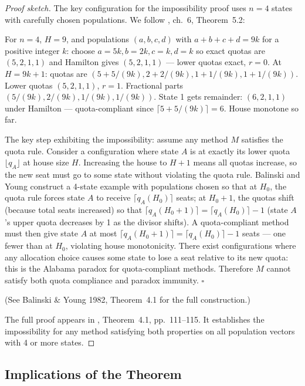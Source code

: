 \begin{proof}[Proof sketch]
  The key configuration for the impossibility proof uses $n = 4$ states
  with carefully chosen populations.
  We follow \citet{balinski1982fair}, ch.~6, Theorem~5.2:

  For $n = 4$, $H = 9$, and populations $(a, b, c, d)$ with
  $a + b + c + d = 9k$ for a positive integer $k$:
  choose $a = 5k, b = 2k, c = k, d = k$ so exact quotas are $(5, 2, 1, 1)$
  and Hamilton gives $(5,2,1,1)$ --- lower quotas exact, $r=0$.
  At $H = 9k+1$: quotas are $(5+5/(9k), 2+2/(9k), 1+1/(9k), 1+1/(9k))$.
  Lower quotas $(5,2,1,1)$, $r=1$. Fractional parts $(5/(9k), 2/(9k), 1/(9k), 1/(9k))$.
  State 1 gets remainder: $(6,2,1,1)$ under Hamilton --- quota-compliant since $\lceil 5+5/(9k) \rceil = 6$.
  House monotone so far.

  The key step exhibiting the impossibility:
  assume any method $M$ satisfies the quota rule.
  Consider a configuration where state $A$ is at exactly its lower
  quota $\lfloor q_A \rfloor$ at house size $H$.
  Increasing the house to $H+1$ means all quotas increase, so the new
  seat must go to some state without violating the quota rule.
  Balinski and Young construct a 4-state example with populations chosen
  so that at $H_0$, the quota rule forces state $A$ to receive
  $\lceil q_A(H_0) \rceil$ seats;
  at $H_0 + 1$, the quotas shift (because total seats increased)
  so that $\lceil q_A(H_0+1) \rceil = \lceil q_A(H_0) \rceil - 1$
  (state $A$'s upper quota decreases by 1 as the divisor shifts).
  A quota-compliant method must then give state $A$ at most
  $\lceil q_A(H_0+1) \rceil = \lceil q_A(H_0) \rceil - 1$ seats ---
  one fewer than at $H_0$, violating house monotonicity.
  There exist configurations where any allocation choice causes some
  state to lose a seat relative to its new quota: this is the Alabama
  paradox for quota-compliant methods.
  Therefore $M$ cannot satisfy both quota compliance and paradox immunity.
  $\square$

  (See Balinski \& Young 1982, Theorem~4.1 for the full construction.)

  The full proof appears in \citet{balinski1982fair}, Theorem~4.1, pp.\ 111--115.
  It establishes the impossibility for any method satisfying both properties
  on all population vectors with 4 or more states.
\end{proof}

\subsection{Implications of the Theorem}

